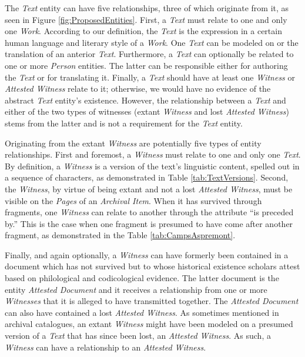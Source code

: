 The \textit{Text} entity can have five relationships, three of which originate from it, as seen in Figure \ref{fig:ProposedEntities}. First, a \textit{Text} must relate to one and only one \textit{Work}. According to our definition, the \textit{Text} is the expression in a certain human language and literary style of a \textit{Work}. One \textit{Text} can be modeled on or the translation of an anterior \textit{Text}. Furthermore, a \textit{Text} can optionally be related to one or more \textit{Person} entities. The latter can be responsible either for authoring the \textit{Text} or for translating it. Finally, a \textit{Text} should have at least one \textit{Witness} or \textit{Attested Witness} relate to it; otherwise, we would have no evidence of the abstract \textit{Text} entity's existence. However, the relationship between a \textit{Text} and either of the two types of witnesses (extant \textit{Witness} and lost \textit{Attested Witness}) stems from the latter and is not a requirement for the \textit{Text} entity.

Originating from the extant \textit{Witness} are potentially five types of entity relationships. First and foremost, a \textit{Witness} must relate to one and only one \textit{Text}. By definition, a \textit{Witness} is a version of the text's linguistic content, spelled out in a sequence of characters, as demonstrated in Table \ref{tab:TextVersions}. Second, the \textit{Witness}, by virtue of being extant and not a lost \textit{Attested Witness}, must be visible on the \textit{Pages} of an \textit{Archival Item}. When it has survived through fragments, one \textit{Witness} can relate to another through the attribute ``is preceded by.'' This is the case when one fragment is presumed to have come after another fragment, as demonstrated in the Table \ref{tab:CampsAspremont}.

Finally, and again optionally, a \textit{Witness} can have formerly been contained in a document which has not survived but to whose historical existence scholars attest based on philological and codicological evidence. The latter document is the entity \textit{Attested Document} and it receives a relationship from one or more \textit{Witnesses} that it is alleged to have transmitted together. The \textit{Attested Document} can also have contained a lost \textit{Attested Witness}. As sometimes mentioned in archival catalogues, an extant \textit{Witness} might have been modeled on a presumed version of a \textit{Text} that has since been lost, an \textit{Attested Witness}. As such, a \textit{Witness} can have a relationship to an \textit{Attested Witness}.

